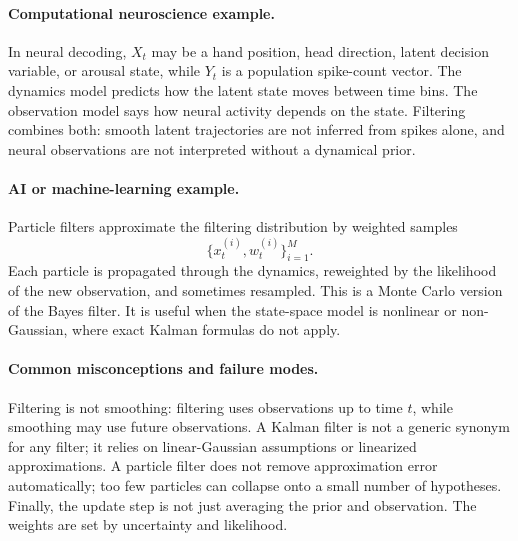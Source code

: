 \paragraph{Computational neuroscience example.}
In neural decoding, \(X_t\) may be a hand position, head direction, latent decision variable, or arousal state, while \(Y_t\) is a population spike-count vector. The dynamics model predicts how the latent state moves between time bins. The observation model says how neural activity depends on the state. Filtering combines both: smooth latent trajectories are not inferred from spikes alone, and neural observations are not interpreted without a dynamical prior.

\paragraph{AI or machine-learning example.}
Particle filters approximate the filtering distribution by weighted samples
\[
\{x_t^{(i)},w_t^{(i)}\}_{i=1}^M.
\]
Each particle is propagated through the dynamics, reweighted by the likelihood of the new observation, and sometimes resampled. This is a Monte Carlo version of the Bayes filter. It is useful when the state-space model is nonlinear or non-Gaussian, where exact Kalman formulas do not apply.

\paragraph{Common misconceptions and failure modes.}
Filtering is not smoothing: filtering uses observations up to time \(t\), while smoothing may use future observations. A Kalman filter is not a generic synonym for any filter; it relies on linear-Gaussian assumptions or linearized approximations. A particle filter does not remove approximation error automatically; too few particles can collapse onto a small number of hypotheses. Finally, the update step is not just averaging the prior and observation. The weights are set by uncertainty and likelihood.

